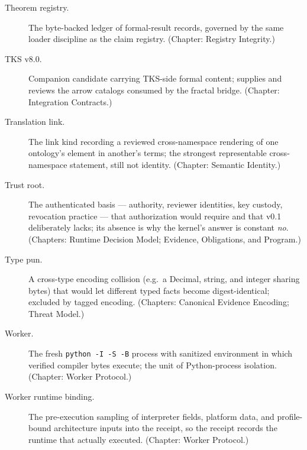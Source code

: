 \begin{description}
\item[Theorem registry.] The byte-backed ledger of formal-result records, governed by the same loader discipline as the claim registry. (Chapter: Registry Integrity.)

\item[TKS v8.0.] Companion candidate carrying TKS-side formal content; supplies and reviews the arrow catalogs consumed by the fractal bridge. (Chapter: Integration Contracts.)

\item[Translation link.] The link kind recording a reviewed cross-namespace rendering of one ontology's element in another's terms; the strongest representable cross-namespace statement, still not identity. (Chapter: Semantic Identity.)

\item[Trust root.] The authenticated basis --- authority, reviewer identities, key custody, revocation practice --- that authorization would require and that v0.1 deliberately lacks; its absence is why the kernel's answer is constant \emph{no}. (Chapters: Runtime Decision Model; Evidence, Obligations, and Program.)

\item[Type pun.] A cross-type encoding collision (e.g.\ a Decimal, string, and integer sharing bytes) that would let different typed facts become digest-identical; excluded by tagged encoding. (Chapters: Canonical Evidence Encoding; Threat Model.)

\item[Worker.] The fresh \texttt{python -I -S -B} process with sanitized environment in which verified compiler bytes execute; the unit of Python-process isolation. (Chapter: Worker Protocol.)

\item[Worker runtime binding.] The pre-execution sampling of interpreter fields, platform data, and profile-bound architecture inputs into the receipt, so the receipt records the runtime that actually executed. (Chapter: Worker Protocol.)

\end{description}
